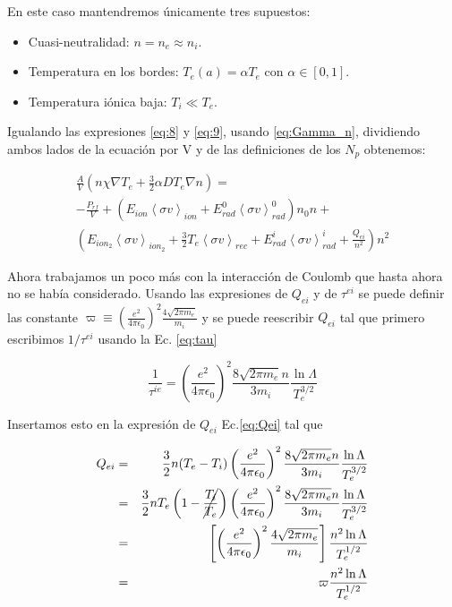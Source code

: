 \documentclass[11pt]{article}
\theoremstyle{definition}
\begin{document}
  En este caso mantendremos \'unicamente tres supuestos:

  \begin{itemize}
    \item Cuasi-neutralidad: $n = n_e \approx n_i$.
    \item Temperatura en los bordes: $T_e(a) = \alpha T_e$ con $\alpha \in [0,1]$.
    \item Temperatura i\'onica baja: $T_i \ll T_e$.
  \end{itemize}

  Igualando las expresiones \eqref{eq:8} y \eqref{eq:9}, usando \eqref{eq:Gamma_n}, dividiendo ambos lados de la ecuaci\'on por V y de las definiciones de los $N_p$ obtenemos:

  \begin{eqnarray*}
  \frac{A}{V}(n\chi\nabla T_e + \frac{3}{2}\alpha D T_e \nabla n) = \\
  -\frac{P_{rf}}{V} + (E_{ion}\left<\sigma v\right>_{ion} + E_{rad}^0\left<\sigma v\right>_{rad}^0)n_0 n + \\ \left(E_{ion_2}\left<\sigma v\right>_{ion_2} + \frac{3}{2}T_e\left<\sigma v\right>_{rec} + E_{rad}^i\left<\sigma v\right>_{rad}^i + \frac{Q_{ei}}{n^2}\right)n^2
\end{eqnarray*}

Ahora trabajamos un poco m\'as con la interacci\'on de Coulomb que hasta ahora no se hab\'ia considerado. Usando las expresiones de $Q_{ei}$ y de $\tau^{ei}$ se puede definir las constante $\varpi \equiv \left(\frac{e^2}{4\pi\epsilon_0}\right)^2\frac{4\sqrt{2\pi m_e}}{m_i}$ y se puede reescribir $Q_{ei}$ tal que primero escribimos $1 / \tau^{ei}$ usando la Ec. \eqref{eq:tau}

  \begin{equation*}
    \frac{1}{\tau^{ie}} = \left(\frac{e^2}{4\pi\epsilon_0}\right)^2\frac{8\sqrt{2\pi m_e}n}{3 m_i}\frac{\ln{\Lambda}}{T_e^{3/2}}
  \end{equation*} 

  Insertamos esto en la expresi\'on de $Q_{ei}$ Ec.\eqref{eq:Qei} tal que 

  \begin{eqnarray}
    Q_{ei} &=& \frac{3}{2}n(T_e - T_i) \left(\frac{e^2}{4\pi\epsilon_0}\right)^2\frac{8\sqrt{2\pi m_e}n}{3 m_i}\frac{\ln{\Lambda}}{T_e^{3/2}} \nonumber \\
           &=& \frac{3}{2}nT_e\left(1 - \cancel{\frac{T_i}{T_e}}\right) \left(\frac{e^2}{4\pi\epsilon_0}\right)^2\frac{8\sqrt{2\pi m_e}n}{3 m_i}\frac{\ln{\Lambda}}{T_e^{3/2}} \nonumber \\
           &=& \left[\left(\frac{e^2}{4\pi\epsilon_0}\right)^2\frac{4\sqrt{2\pi m_e}}{m_i}\right]\frac{n^2\ln{\Lambda}}{T_e^{1/2}} \nonumber \\
           &=& \varpi\frac{n^2\ln{\Lambda}}{T_e^{1/2}}
  \end{eqnarray}
\end{document}
